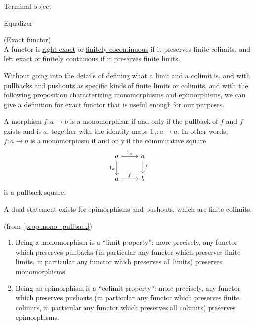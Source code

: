 Terminal object

Equalizer

\begin{definition}{(Exact functor)}\label{def:exact_functor}\\
A functor is \ul{right exact} or \ul{finitely cocontinuous} if it preserves finite colimits, and \ul{left exact} or \ul{finitely continuous} if it preserves finite limits.
\end{definition}

\begin{remark}
Without going into the details of defining what a limit and a colimit is, and with \ul{pullbacks} and \ul{pushouts} as specific kinds of
finite limits or colimits, and with the following proposition characterizing monomorphisms and epimorphisms,
we can give a definition for exact functor that is useful enough for our purposes.
\end{remark}

\begin{lemma}\label{prop:mono_pullback}
A morphism $f : a \rightarrow b$ is a monomorphism if and only if
the pullback of $f$ and $f$ exists and is $a$, together with the identity maps $1_{a} : a \rightarrow a$.
In other words, $f : a \rightarrow b$ is a monomorphism if and only if the commutative square
\[
\begin{tikzcd}
a \arrow[r, "1_{a}"] \arrow[d, "1_{a}"'] & a \arrow[d, "f"] \\
a \arrow[r, "f"]                         & b               
\end{tikzcd}
\]
is a pullback square.

A dual statement exists for epimorphisms and pushouts, which are finite colimits.
\end{lemma}

\begin{corollary}{(from \ref{prop:mono_pullback})}\label{cor:preserve_mono_epi}

\begin{enumerate}
\item Being a monomorphism is a “limit property”: more precisely, any functor which preserves pullbacks
(in particular any functor which preserves finite limits, in particular any functor which preserves all limits)
preserves monomorphisms.
\item Being an epimorphism is a “colimit property”: more precisely, any functor which preserves pushouts
(in particular any functor which preserves finite colimits, in particular any functor which preserves all colimits)
preserves epimorphisms.
\end{enumerate}
\end{corollary}

